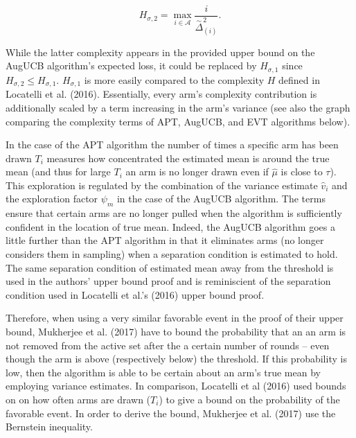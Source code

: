\documentclass[11pt,]{article}
\begin{document}
\begin{equation*}
H_{\sigma,2} = \max_{i \in \mathcal{A}} \frac{i}{\stackrel{\sim}{\Delta}_{(i)}^2}.
\end{equation*}

While the latter complexity appears in the provided upper bound on the
AugUCB algorithm's expected loss, it could be replaced by
\(H_{\sigma, 1}\) since \(H_{\sigma, 2} \leq H_{\sigma,1}\).
\(H_{\sigma,1}\) is more easily compared to the complexity \(H\) defined
in Locatelli et al. (2016). Essentially, every arm's complexity
contribution is additionally scaled by a term increasing in the arm's
variance (see also the graph comparing the complexity terms of APT,
AugUCB, and EVT algorithms below).

In the case of the APT algorithm the number of times a specific arm has
been drawn \(T_i\) measures how concentrated the estimated mean is
around the true mean (and thus for large \(T_i\) an arm is no longer
drawn even if \(\hat{\mu}\) is close to \(\tau\)). This exploration is
regulated by the combination of the variance estimate \(\hat{v}_i\) and
the exploration factor \(\psi_m\) in the case of the AugUCB algorithm.
The terms ensure that certain arms are no longer pulled when the
algorithm is sufficiently confident in the location of true mean.
Indeed, the AugUCB algorithm goes a little further than the APT
algorithm in that it eliminates arms (no longer considers them in
sampling) when a separation condition is estimated to hold. The same
separation condition of estimated mean away from the threshold is used
in the authors' upper bound proof and is reminiscient of the separation
condition used in Locatelli et al.'s (2016) upper bound proof.

Therefore, when using a very similar favorable event in the proof of
their upper bound, Mukherjee et al. (2017) have to bound the probability
that an an arm is not removed from the active set after the a certain
number of rounds -- even though the arm is above (respectively below)
the threshold. If this probability is low, then the algorithm is able to
be certain about an arm's true mean by employing variance estimates. In
comparison, Locatelli et al (2016) used bounds on on how often arms are
drawn (\(T_i\)) to give a bound on the probability of the favorable
event. In order to derive the bound, Mukherjee et al. (2017) use the
Bernstein inequality.
\end{document}

